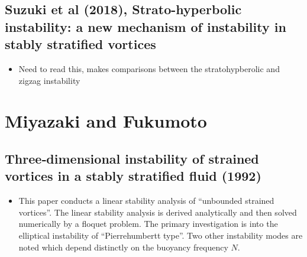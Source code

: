 \documentclass{article}
\begin{document}
\subsection{Suzuki et al (2018), Strato-hyperbolic instability: a new mechanism
of instability in stably stratified vortices}
    \begin{itemize}
        \item Need to read this, makes comparisons between the stratohypberolic
        and zigzag instability
    \end{itemize}


\section{Miyazaki and Fukumoto}
    \subsection{Three‐dimensional instability of strained vortices in a stably
    stratified fluid (1992)}
    \begin{itemize}
        \item This paper conducts a linear stability analysis of ``unbounded
        strained vortices''. The linear stability analysis is derived analytically
        and then solved numerically by a floquet problem. The primary investigation
        is into the elliptical instability of ``Pierrehumbertt type''. Two other
        instability modes are noted which depend distinctly on the buoyancy
        frequency $N$.
    \end{itemize}
\end{document}
